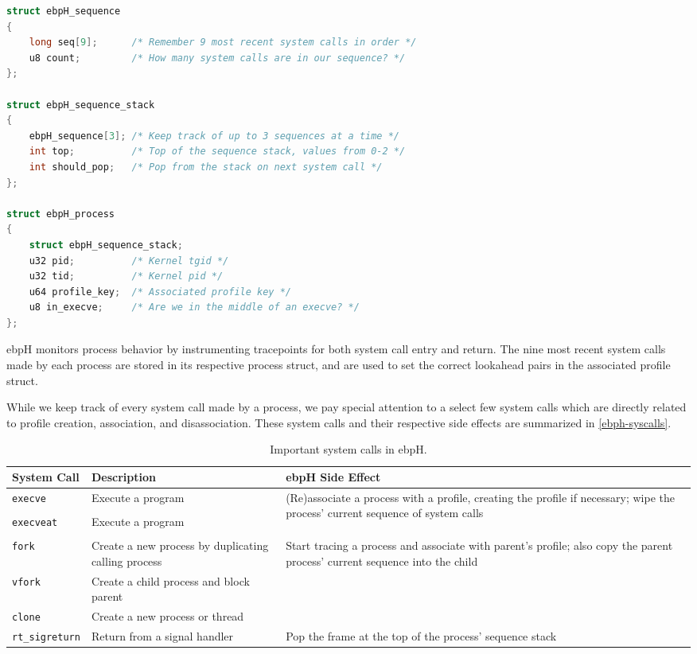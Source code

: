 \documentclass[
  12pt]{findlay}
\begin{document}
\begin{lstlisting}[float={ht}, language=c, label={ebph-process-struct}, caption={A simplified
definition of the ebpH process struct.}]
struct ebpH_sequence
{
    long seq[9];      /* Remember 9 most recent system calls in order */
    u8 count;         /* How many system calls are in our sequence? */
};

struct ebpH_sequence_stack
{
    ebpH_sequence[3]; /* Keep track of up to 3 sequences at a time */
    int top;          /* Top of the sequence stack, values from 0-2 */
    int should_pop;   /* Pop from the stack on next system call */
};

struct ebpH_process
{
    struct ebpH_sequence_stack;
    u32 pid;          /* Kernel tgid */
    u32 tid;          /* Kernel pid */
    u64 profile_key;  /* Associated profile key */
    u8 in_execve;     /* Are we in the middle of an execve? */
};
\end{lstlisting}

ebpH monitors process behavior by instrumenting tracepoints for both
system call entry and return. The nine most recent system calls made by
each process are stored in its respective process struct, and are used
to set the correct lookahead pairs in the associated profile struct.

While we keep track of every system call made by a process, we pay
special attention to a select few system calls which are directly
related to profile creation, association, and disassociation. These
system calls and their respective side effects are summarized in
\autoref{ebph-syscalls}.

\begin{table}
\caption{Important system calls in ebpH.}
\label{ebph-syscalls}
\begin{center}
\begin{tabular}{|l|p{2.4in}|p{2.6in}|}
\hline
\textbf{System Call} & \textbf{Description} & \textbf{ebpH Side Effect}\\
\hline
\hline
\texttt{execve} & Execute a program & \multirow{4}{2.6in}{(Re)associate a process with a profile, creating the profile if necessary;
wipe the process' current sequence of system calls}\\
&&\\
\cline{1-2}
\texttt{execveat} & Execute a program & \\
&&\\
\hline
\texttt{fork} & Create a new process by duplicating calling process & \multirow{3}{2.6in}{Start tracing a process and associate with parent's profile; also copy the parent process' current sequence into the child}\\
\cline{1-2}
\texttt{vfork} & Create a child process and block parent &\\
\cline{1-2}
\texttt{clone} & Create a new process or thread &\\
\hline
\texttt{rt\_sigreturn} & Return from a signal handler & Pop the frame at the top of the process' sequence stack\\
\hline
\end{tabular}
\end{center}
\end{table}
\end{document}
